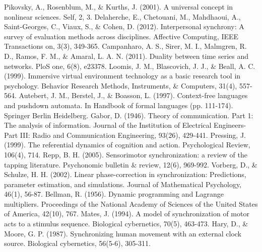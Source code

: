 \documentclass[12pt]{article}
\begin{document}
\begin{thebibliography}{}
    Pikovsky, A., Rosenblum, M., \& Kurths, J. (2001). A universal concept in nonlinear sciences. Self, 2, 3.
    Delaherche, E., Chetouani, M., Mahdhaoui, A., Saint-Georges, C., Viaux, S., \& Cohen, D. (2012). Interpersonal synchrony: A survey of evaluation methods across disciplines. Affective Computing, IEEE Transactions on, 3(3), 349-365.
    Campanharo, A. S., Sirer, M. I., Malmgren, R. D., Ramos, F. M., \& Amaral, L. A. N. (2011). Duality between time series and networks. PloS one, 6(8), e23378.
    Loomis, J. M., Blascovich, J. J., \& Beall, A. C. (1999). Immersive virtual environment technology as a basic research tool in psychology. Behavior Research Methods, Instruments, \& Computers, 31(4), 557-564.
    Autebert, J. M., Berstel, J., \& Boasson, L. (1997). Context-free languages and pushdown automata. In Handbook of formal languages (pp. 111-174). Springer Berlin Heidelberg.
    Gabor, D. (1946). Theory of communication. Part 1: The analysis of information. Journal of the Institution of Electrical Engineers-Part III: Radio and Communication Engineering, 93(26), 429-441.
    Pressing, J. (1999). The referential dynamics of cognition and action. Psychological Review, 106(4), 714.
    Repp, B. H. (2005). Sensorimotor synchronization: a review of the tapping literature. Psychonomic bulletin \& review, 12(6), 969-992.
    Vorberg, D., \& Schulze, H. H. (2002). Linear phase-correction in synchronization: Predictions, parameter estimation, and simulations. Journal of Mathematical Psychology, 46(1), 56-87.
    Bellman, R. (1956). Dynamic programming and Lagrange multipliers. Proceedings of the National Academy of Sciences of the United States of America, 42(10), 767.
    Mates, J. (1994). A model of synchronization of motor acts to a stimulus sequence. Biological cybernetics, 70(5), 463-473.
    Hary, D., \& Moore, G. P. (1987). Synchronizing human movement with an external clock source. Biological cybernetics, 56(5-6), 305-311.
\end{thebibliography}
\end{document}
